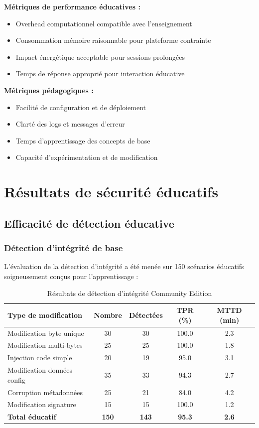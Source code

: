 \textbf{Métriques de performance éducatives :}
\begin{itemize}
    \item Overhead computationnel compatible avec l'enseignement
    \item Consommation mémoire raisonnable pour plateforme contrainte
    \item Impact énergétique acceptable pour sessions prolongées
    \item Temps de réponse approprié pour interaction éducative
\end{itemize}

\textbf{Métriques pédagogiques :}
\begin{itemize}
    \item Facilité de configuration et de déploiement
    \item Clarté des logs et messages d'erreur
    \item Temps d'apprentissage des concepts de base
    \item Capacité d'expérimentation et de modification
\end{itemize}

\section{Résultats de sécurité éducatifs}

\subsection{Efficacité de détection éducative}

\subsubsection{Détection d'intégrité de base}

L'évaluation de la détection d'intégrité a été menée sur 150 scénarios éducatifs soigneusement conçus pour l'apprentissage :

\begin{table}[h]
\centering
\caption{Résultats de détection d'intégrité Community Edition}
\label{tab:integrity-detection-community}
\begin{tabular}{|l|c|c|c|c|}
\hline
\textbf{Type de modification} & \textbf{Nombre} & \textbf{Détectées} & \textbf{TPR (\%)} & \textbf{MTTD (min)} \\
\hline
Modification byte unique & 30 & 30 & 100.0 & 2.3 \\
Modification multi-bytes & 25 & 25 & 100.0 & 1.8 \\
Injection code simple & 20 & 19 & 95.0 & 3.1 \\
Modification données config & 35 & 33 & 94.3 & 2.7 \\
Corruption métadonnées & 25 & 21 & 84.0 & 4.2 \\
Modification signature & 15 & 15 & 100.0 & 1.2 \\
\hline
\textbf{Total éducatif} & \textbf{150} & \textbf{143} & \textbf{95.3} & \textbf{2.6} \\
\hline
\end{tabular}
\end{table}

